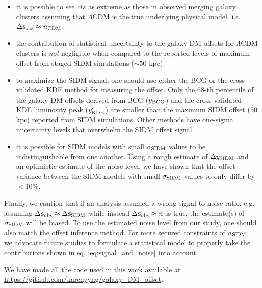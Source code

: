 \begin{itemize}
		\item it is possible to see $\Delta s$ as extreme as those in observed merging 
			galaxy clusters assuming that $\Lambda$CDM is the true underlying physical model. 
	i.e. $\Delta {\bf s}_{\rm obs} \approx n_{\rm CDM}$.\\

		\item the contribution of statistical uncertainty to the galaxy-DM offsets 
			for $\Lambda$CDM clusters is {\it not} negligible when compared to the reported  
			levels of maximum offset from staged SIDM simulations ($\sim 50$ kpc).\\ 
		
		\item to maximize the SIDM signal, one should use either the BCG or the
			cross validated KDE method for measuring the offset.
		  Only the 68-th percentile of the galaxy-DM offsets derived from BCG ($y_{\rm BCG}$) and 
			the cross-validated KDE luminosity peak	($y_{\rm KDE}'$)
			are smaller than the maximum SIDM offset ($50$ kpc) reported from SIDM simulations. 
			Other methods have one-sigma uncertainty levels that overwhelm the
			SIDM offset signal.\\ 

		\item it is possible for SIDM models with small $\sigma_{\rm SIDM}$ values to be
			indistinguishable from one another. 
			Using a rough estimate of $\Delta y_{\rm SIDM}$ and an optimistic estimate of the
			noise level, we have shown that the offset variance between the
			SIDM models with small $\sigma_{\rm SIDM}$ values to only differ by $< 10\%$.

\end{itemize}
Finally, we caution that if an analysis assumed a wrong signal-to-noise ratio, e.g.
assuming $\Delta {\bf s}_{\rm obs} \approx \Delta {\bf s}_{\rm SIDM}$ while instead $\Delta {\bf s}_{\rm obs}
\approx n$ is true, the estimate(s) of $\sigma_{\rm SIDM}$ will be biased.
To use the estimated noise level from our study, one should also match the
offset inference method.
For more secured constraints of $\sigma_{\rm SIDM}$,
we advocate future studies to formulate a statistical model 
to properly take the contributions shown in eq. \ref{eq:signal_and_noise} into 
account.

We have made all the code used in this work available at \\
\href{https://github.com/karenyyng/galaxy\_DM\_offset}{https://github.com/karenyyng/galaxy\_DM\_offset}.

